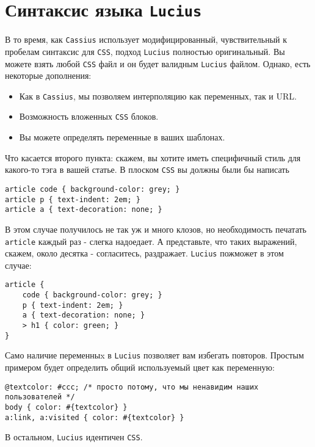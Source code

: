 \section{Синтаксис языка \texttt{Lucius}}
В то время, как \texttt{Cassius} использует модифицированный, чувствительный к пробелам
синтаксис для \texttt{CSS}, подход \texttt{Lucius} полностью оригинальный. Вы можете взять любой \texttt{CSS}
файл и он будет валидным \texttt{Lucius} файлом. Однако, есть некоторые дополнения:

\begin{itemize}
\item Как в \texttt{Cassius}, мы позволяем интерполяцию как переменных, так и URL.
\item Возможность вложенных \texttt{CSS} блоков.
\item Вы можете определять переменные в ваших шаблонах.
\end{itemize}

Что касается второго пункта: скажем, вы хотите иметь специфичный стиль для
какого-то тэга в вашей статье. В плоском \texttt{CSS} вы должны были бы написать

\begin{lstlisting}
article code { background-color: grey; }
article p { text-indent: 2em; }
article a { text-decoration: none; }
\end{lstlisting}

В этом случае получилось не так уж и много клозов, но необходимость печатать
\texttt{article} каждый раз - слегка надоедает. А представьте, что таких выражений,
скажем, около десятка - согласитесь, раздражает.
\texttt{Lucius} пожможет в этом случае:

\begin{lstlisting}
article {
    code { background-color: grey; }
    p { text-indent: 2em; }
    a { text-decoration: none; }
    > h1 { color: green; }
}
\end{lstlisting}

Само наличие переменныx в \texttt{Lucius} позволяет вам избегать повторов. Простым примером
будет определить общий используемый цвет как переменную:

\begin{lstlisting}
@textcolor: #ccc; /* просто потому, что мы ненавидим наших пользователей */
body { color: #{textcolor} }
a:link, a:visited { color: #{textcolor} }
\end{lstlisting}

В остальном, \texttt{Lucius} идентичен \texttt{CSS}.

